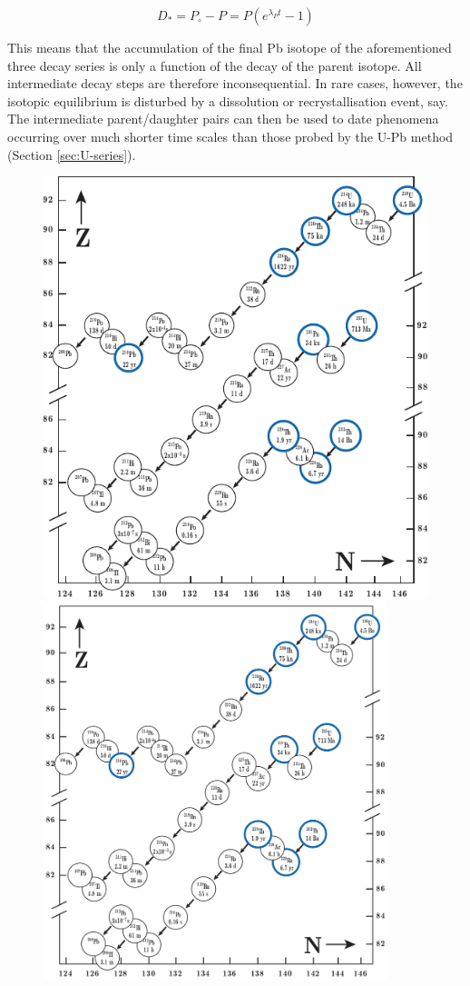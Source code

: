 \documentclass{book}
\newif\ifpdf
\begin{document}
\begin{equation}
D_* = P_\circ - P = P \left( e^{\lambda_P t} -1 \right)
\label{eq:ND*4}
\end{equation}

This means that the accumulation of the final Pb isotope of the
aforementioned three decay series is only a function of the decay of
the parent isotope.  All intermediate decay steps are therefore
inconsequential. In rare cases, however, the isotopic equilibrium is
disturbed by a dissolution or recrystallisation event, say. The
intermediate parent/daughter pairs can then be used to date phenomena
occurring over much shorter time scales than those probed by the U-Pb
method (Section \ref{sec:U-series}).

\begin{figure}[!ht]
  \centering
  \ifpdf
  \includegraphics[width=\textwidth]{U-Th-series.pdf}
  \else
  \includegraphics[width=10cm]{U-Th-series.png}

\end{figure}
\end{document}

